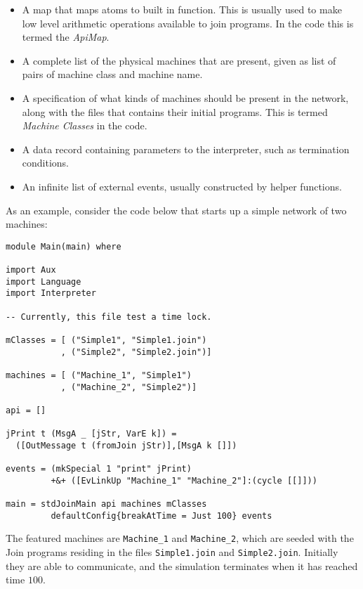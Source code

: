 \begin{itemize}

\item A map that maps atoms to built in function. This is usually used to make
low level arithmetic operations available to join programs. In the code this is
termed the \emph{ApiMap}.

\item A complete list of the physical machines that are present, given as list
of pairs of machine class and machine name.

\item A specification of what kinds of machines should be present in the
network, along with the files that contains their initial programs. This is
termed \emph{Machine Classes} in the code.

\item A data record containing parameters to the interpreter, such as
termination conditions.

\item An infinite list of external events, usually constructed by helper
functions.

\end{itemize}

As an example, consider the code below that starts up a simple network of two
machines:
\begin{verbatim}
module Main(main) where

import Aux
import Language
import Interpreter

-- Currently, this file test a time lock.

mClasses = [ ("Simple1", "Simple1.join")
           , ("Simple2", "Simple2.join")]

machines = [ ("Machine_1", "Simple1")
           , ("Machine_2", "Simple2")]

api = []

jPrint t (MsgA _ [jStr, VarE k]) =
  ([OutMessage t (fromJoin jStr)],[MsgA k []])

events = (mkSpecial 1 "print" jPrint)
         +&+ ([EvLinkUp "Machine_1" "Machine_2"]:(cycle [[]]))

main = stdJoinMain api machines mClasses
         defaultConfig{breakAtTime = Just 100} events
\end{verbatim}

The featured machines are \texttt{Machine\_1} and \texttt{Machine\_2}, which are
seeded with the Join programs residing in the files \texttt{Simple1.join} and
\texttt{Simple2.join}. Initially they are able to communicate, and the
simulation terminates when it has reached time $100$.

